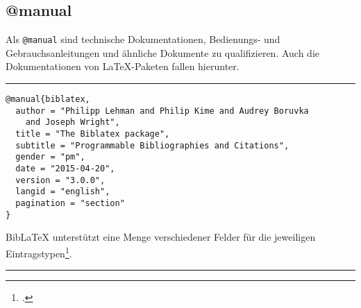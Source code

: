\documentclass[11pt,a4paper,DIV=calc]{scrartcl}
\newcommand\software[1]{\textsf{#1}}
\newcommand\Biblatex{\software{Bib\LaTeX{}}\xspace}
\newenvironment{rubexample}{\par\vspace{\baselineskip}\hrule\par\begin{refsection}}{\end{refsection}\par\hrule\par\vspace{\baselineskip}}
\begin{document}
\subsection{@manual}

Als \verb+@manual+ sind technische Dokumentationen,
Bedienungs- und Gebrauchsanleitungen und ähnliche Dokumente zu
qualifizieren. Auch die Dokumentationen von \LaTeX{}-Pa\-ke\-ten
fallen hierunter.

\begin{rubexample}
\begin{verbatim}
@manual{biblatex,
  author = "Philipp Lehman and Philip Kime and Audrey Boruvka
    and Joseph Wright",
  title = "The Biblatex package",
  subtitle = "Programmable Bibliographies and Citations",
  gender = "pm",
  date = "2015-04-20",
  version = "3.0.0",
  langid = "english",
  pagination = "section"
}
\end{verbatim}

\Biblatex unterstützt eine Menge verschiedener Felder für die
jeweiligen Eintragstypen\footcite[2.2.2]{biblatex}.

\printbibliography
\end{rubexample}
\end{document}
